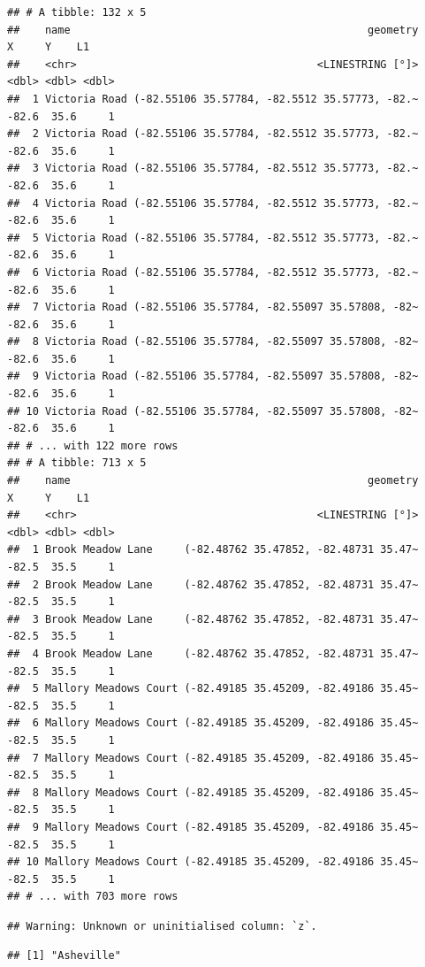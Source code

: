 \documentclass[
]{article}
\begin{document}
\begin{verbatim}
## # A tibble: 132 x 5
##    name                                               geometry     X     Y    L1
##    <chr>                                      <LINESTRING [°]> <dbl> <dbl> <dbl>
##  1 Victoria Road (-82.55106 35.57784, -82.5512 35.57773, -82.~ -82.6  35.6     1
##  2 Victoria Road (-82.55106 35.57784, -82.5512 35.57773, -82.~ -82.6  35.6     1
##  3 Victoria Road (-82.55106 35.57784, -82.5512 35.57773, -82.~ -82.6  35.6     1
##  4 Victoria Road (-82.55106 35.57784, -82.5512 35.57773, -82.~ -82.6  35.6     1
##  5 Victoria Road (-82.55106 35.57784, -82.5512 35.57773, -82.~ -82.6  35.6     1
##  6 Victoria Road (-82.55106 35.57784, -82.5512 35.57773, -82.~ -82.6  35.6     1
##  7 Victoria Road (-82.55106 35.57784, -82.55097 35.57808, -82~ -82.6  35.6     1
##  8 Victoria Road (-82.55106 35.57784, -82.55097 35.57808, -82~ -82.6  35.6     1
##  9 Victoria Road (-82.55106 35.57784, -82.55097 35.57808, -82~ -82.6  35.6     1
## 10 Victoria Road (-82.55106 35.57784, -82.55097 35.57808, -82~ -82.6  35.6     1
## # ... with 122 more rows
## # A tibble: 713 x 5
##    name                                               geometry     X     Y    L1
##    <chr>                                      <LINESTRING [°]> <dbl> <dbl> <dbl>
##  1 Brook Meadow Lane     (-82.48762 35.47852, -82.48731 35.47~ -82.5  35.5     1
##  2 Brook Meadow Lane     (-82.48762 35.47852, -82.48731 35.47~ -82.5  35.5     1
##  3 Brook Meadow Lane     (-82.48762 35.47852, -82.48731 35.47~ -82.5  35.5     1
##  4 Brook Meadow Lane     (-82.48762 35.47852, -82.48731 35.47~ -82.5  35.5     1
##  5 Mallory Meadows Court (-82.49185 35.45209, -82.49186 35.45~ -82.5  35.5     1
##  6 Mallory Meadows Court (-82.49185 35.45209, -82.49186 35.45~ -82.5  35.5     1
##  7 Mallory Meadows Court (-82.49185 35.45209, -82.49186 35.45~ -82.5  35.5     1
##  8 Mallory Meadows Court (-82.49185 35.45209, -82.49186 35.45~ -82.5  35.5     1
##  9 Mallory Meadows Court (-82.49185 35.45209, -82.49186 35.45~ -82.5  35.5     1
## 10 Mallory Meadows Court (-82.49185 35.45209, -82.49186 35.45~ -82.5  35.5     1
## # ... with 703 more rows
\end{verbatim}

\begin{verbatim}
## Warning: Unknown or uninitialised column: `z`.
\end{verbatim}

\begin{verbatim}
## [1] "Asheville"
\end{verbatim}
\end{document}
